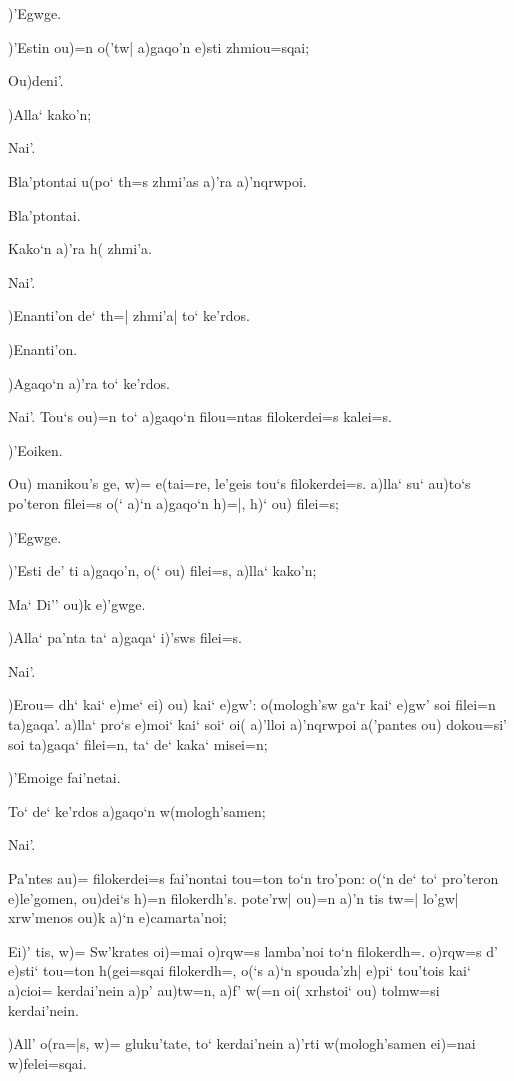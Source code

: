 \documentclass[11pt]{book}
\newcommand {\Spag} {\Npag*{=+1}\Npar{1}\numerus{1}}
\newcommand {\Spar} {\Npar*{=+1}\numerus{1}}
\begin{document}
\2 \Spag )'Egwge.

\1 )'Estin ou)=n o('tw| a)gaqo'n e)sti zhmiou=sqai;

\2 Ou)deni'.

\1 )Alla` kako'n;

\2 Nai'.

\1 Bla'ptontai u(po` th=s zhmi'as a)'ra a)'nqrwpoi.

\2 Bla'ptontai.

\1 Kako`n a)'ra h( zhmi'a.

\2 Nai'.

\1 )Enanti'on de` th=| zhmi'a| to` ke'rdos.

\2 )Enanti'on.

\1 )Agaqo`n a)'ra to` ke'rdos.

\2 Nai'.
\1 \Spar Tou`s ou)=n to` a)gaqo`n filou=ntas filokerdei=s kalei=s.

\2 )'Eoiken.

\1 Ou) manikou's ge, w)= e(tai=re, le'geis tou`s filokerdei=s. a)lla` su`
au)to`s po'teron filei=s o(` a)`n a)gaqo`n h)=|, h)` ou) filei=s;

\2 )'Egwge.

\1 )'Esti de' ti a)gaqo'n, o(` ou) filei=s, a)lla` kako'n;

\2 Ma` Di'' ou)k e)'gwge.

\1 )Alla` pa'nta ta` a)gaqa` i)'sws filei=s.

\2 Nai'.

\1 )Erou= dh` kai` e)me` ei) ou) kai` e)gw': o(mologh'sw ga`r kai`
\Spar %
e)gw' soi filei=n ta)gaqa'. a)lla` pro`s e)moi` kai` soi` oi( a)'lloi
a)'nqrwpoi a('pantes ou) dokou=si' soi ta)gaqa` filei=n, ta` de` kaka` misei=n;

\2 )'Emoige fai'netai.

\1 To` de` ke'rdos a)gaqo`n w(mologh'samen;

\2 Nai'.

\1 Pa'ntes au)= filokerdei=s fai'nontai tou=ton to`n tro'pon: o(`n de` to`
pro'teron e)le'gomen, ou)dei`s h)=n filokerdh's. pote'rw| ou)=n a)'n tis tw=|
lo'gw| xrw'menos ou)k a)`n e)camarta'noi;

\2 Ei)' tis, w)= Sw'krates oi)=mai o)rqw=s lamba'noi to`n
\Spar %
filokerdh=. o)rqw=s d' e)sti` tou=ton h(gei=sqai filokerdh=, o(`s a)`n
spouda'zh| e)pi` tou'tois kai` a)cioi= kerdai'nein a)p' au)tw=n, a)f' w(=n oi(
xrhstoi` ou) tolmw=si kerdai'nein.

\1 )All' o(ra=|s, w)= gluku'tate, to` kerdai'nein a)'rti w(mologh'samen ei)=nai
w)felei=sqai.
\end{document}
